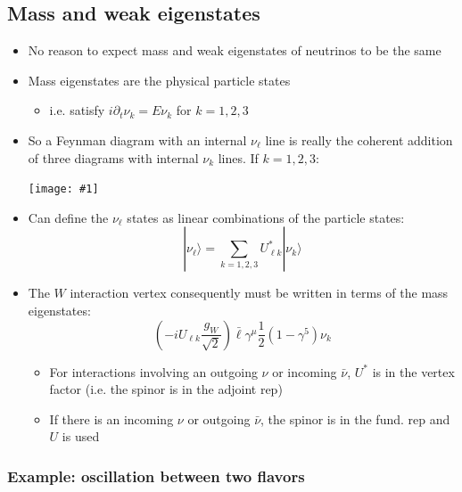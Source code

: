\documentclass[11pt]{article}
\newcommand{\nubar}{{\bar{\nu}}}
\newcommand{\ra}{\rangle}
\newcommand{\embedimgw}[2]{\begin{center}\texttt{[image: \#1]}\end{center}}
\begin{document}
\subsection{Mass and weak eigenstates}
\begin{itemize}
  \item No reason to expect mass and weak eigenstates of neutrinos to be the same
  \item Mass eigenstates are the physical particle states
  \begin{itemize}
    \item i.e. satisfy $i \partial_t\nu_k = E\nu_k$ for $k=1,2,3$
  \end{itemize}
  \item So a Feynman diagram with an internal $\nu_\ell$ line is really the coherent addition of three diagrams with internal $\nu_k$ lines. If $k=1,2,3$: 
  \embedimgw{figs/internalnulines.png}{.6}
  \item Can define the $\nu_\ell$ states as linear combinations of the particle states:
  \begin{equation}
    |\nu_\ell\ra = \sum_{k=1,2,3} U^*_{\ell k} |\nu_k\ra
  \end{equation}
  \item The $W$ interaction vertex consequently must be written in terms of the mass eigenstates:
  \begin{equation}
    \left(-i U_{\ell k} \frac{g_W}{\sqrt{2}}\right) \bar\ell \gamma^\mu \frac{1}{2} (1-\gamma^5) \nu_k
  \end{equation}
  \begin{itemize}
    \item For interactions involving an outgoing $\nu$ or incoming $\nubar$, $U^*$ is in the vertex factor (i.e. the spinor is in the adjoint rep)
    \item If there is an incoming $\nu$ or outgoing $\nubar$, the spinor is in the fund. rep and $U$ is used
  \end{itemize}
\end{itemize}

\subsubsection{Example: oscillation between two flavors}
\end{document}
